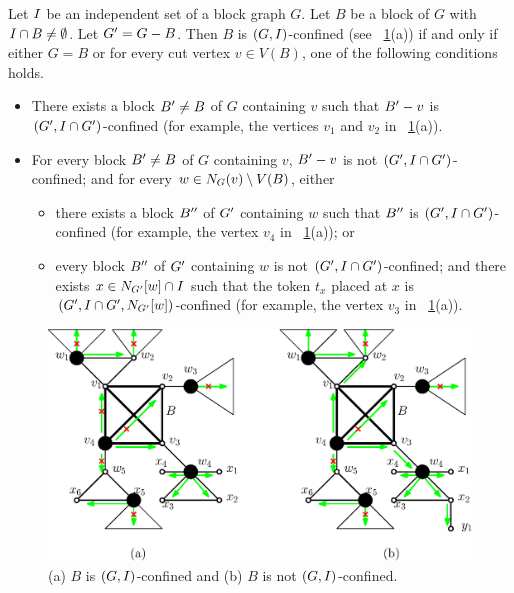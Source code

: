 \documentclass[a4paper]{llncs}
\begin{document}
\begin{lemma}
\label{lem:characterize-confined-clique}
Let $I$ be an independent set of a block graph $G$.
Let $B$ be a block of $G$ with $I \cap B \neq \emptyset$.
Let ${G^\prime} = G - B$.
Then $B$ is $(G, I)$-confined (see \figurename~\ref{fig:characterize-confined-cliques}(a)) if and only if either $G = B$ or for every cut vertex $v \in V(B)$, one of the following conditions holds.

\begin{itemize}
\item [(i)] There exists a block $B^{\prime} \neq B$ of $G$ containing $v$ such that $B^{\prime} - v$ is $({G^\prime}, I \cap {G^\prime})$-confined (for example, the vertices $v_1$ and $v_2$ in \figurename~\ref{fig:characterize-confined-cliques}(a)).

\item [(ii)] For every block $B^{\prime} \neq B$ of $G$ containing $v$, $B^{\prime} - v$ is not $({G^\prime}, I \cap {G^\prime})$-confined; and for every $w \in N_{G}(v) \setminus V(B)$, either
\begin{itemize}

  \item [(ii-1)] there exists a block $B^{\prime\prime}$ of ${G^\prime}$ containing $w$ such that $B^{\prime\prime}$ is $({G^\prime}, I \cap {G^\prime})$-confined (for example, the vertex $v_4$ in \figurename~\ref{fig:characterize-confined-cliques}(a)); or

  \item [(ii-2)] every block $B^{\prime\prime}$ of ${G^\prime}$ containing $w$ is not $({G^\prime}, I \cap {G^\prime})$-confined;  and there exists $x \in N_{{G^\prime}}[w] \cap I$ such that the token $t_x$ placed at $x$ is $({G^\prime}, I \cap {G^\prime}, N_{{G^\prime}}[w])$-confined (for example, the vertex $v_3$ in \figurename~\ref{fig:characterize-confined-cliques}(a)).
\end{itemize}

\noindent
\end{itemize}

\noindent
\end{lemma}




\begin{figure}[!ht]  %
  \centerline{\includegraphics[scale=0.6]{fig/characterize-confined-cliques.eps}}
  \caption{
  (a) $B$ is $(G, I)$-confined and (b) $B$ is not $(G, I)$-confined. \label{fig:characterize-confined-cliques}
  }
\end{figure}
\end{document}
